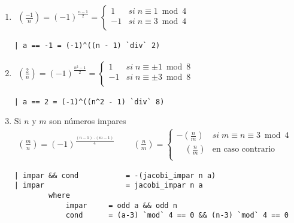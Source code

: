 \documentclass[10pt,spanish]{article}
\begin{document}
\begin{enumerate}[1.]
\begin{verbatim}
| a == 1 = 1
\end{verbatim}

\item
\begin{equation*}
    \begin{aligned}
    \left( \frac{-1}{n} \right) = (-1)^{\frac{n-1}{2}} = \begin{cases}
        1 & si \;n \equiv 1 \bmod 4 \\
        -1 & si \;n \equiv 3 \bmod 4\\
        \end{cases}
    \end{aligned}
    \phantom{\hspace{18cm}}
\end{equation*}

\begin{verbatim}
| a == -1 = (-1)^((n - 1) `div` 2)
\end{verbatim}

\item
\begin{equation*}
    \begin{aligned}
    \left( \frac{2}{n} \right) = (-1)^{\frac{n^2-1}{2}} = \begin{cases}
        1 & si \;n \equiv \pm 1 \bmod 8 \\
        -1 & si \;n \equiv \pm 3 \bmod 8\\
        \end{cases}
    \end{aligned}
    \phantom{\hspace{18cm}}
\end{equation*}

\begin{verbatim}
| a == 2 = (-1)^((n^2 - 1) `div` 8)
\end{verbatim}

\item Si $n$ y $m$ son números impares
\begin{equation*}
    \begin{aligned}
    \left( \frac{m}{n} \right) = (-1)^{\frac{(n-1)\cdot(m-1)}{4}} \qquad\ \left( \frac{n}{m} \right) = \begin{cases}
        - \left( \frac{n}{m} \right) & si \;m \equiv n \equiv 3 \bmod 4 \\
        \quad\left( \frac{n}{m} \right) & \text{en caso contrario}\\
        \end{cases}
    \end{aligned}
    \phantom{\hspace{18cm}}
\end{equation*}

\begin{verbatim}
| impar && cond           = -(jacobi_impar n a)
| impar                   = jacobi_impar n a
        where
            impar     = odd a && odd n 
            cond      = (a-3) `mod` 4 == 0 && (n-3) `mod` 4 == 0
\end{verbatim}
\end{enumerate}
\end{document}
